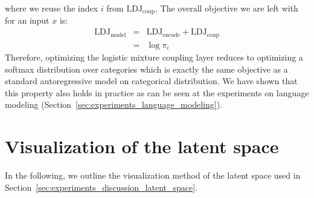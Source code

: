 where we reuse the index $i$ from $\text{LDJ}_{\text{coup}}$. 
The overall objective we are left with for an input $x$ is:
\begin{eqnarray}
\text{LDJ}_{\text{model}} & = & \text{LDJ}_{\text{encode}} + \text{LDJ}_{\text{coup}} \\
& = & \log \pi_i
\end{eqnarray}	
Therefore, optimizing the logistic mixture coupling layer reduces to optimizing a softmax distribution over categories which is exactly the same objective as a standard autoregressive model on categorical distribution. 
We have shown that this property also holds in practice as can be seen at the experiments on language modeling (Section~\ref{sec:experiments_language_modeling}).

\newpage
\section{Visualization of the latent space}
\label{sec:appendix_latent_space_visualization}

In the following, we outline the visualization method of the latent space used in Section~\ref{sec:experiments_discussion_latent_space}.


